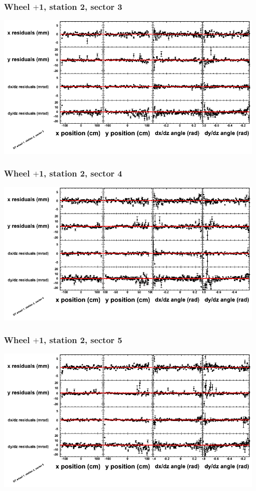 \documentclass[compress]{beamer}
\begin{document}
\begin{frame}
\frametitle{Wheel $+$1, station 2, sector 3}
\includegraphics[width=\linewidth]{tmppoly_MBwhDst2sec03.png}
\end{frame}

\begin{frame}
\frametitle{Wheel $+$1, station 2, sector 4}
\includegraphics[width=\linewidth]{tmppoly_MBwhDst2sec04.png}
\end{frame}

\begin{frame}
\frametitle{Wheel $+$1, station 2, sector 5}
\includegraphics[width=\linewidth]{tmppoly_MBwhDst2sec05.png}
\end{frame}
\end{document}
